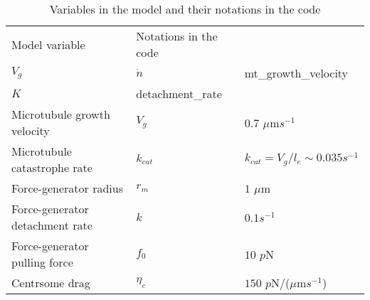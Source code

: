 \documentclass[11pt]{article}
\begin{document}
%
\begin{table}[h]
\caption{Variables in the model and their notations in the code}
\begin{center}
\begin{tabular}{@{}lll@{}}
        \toprule
        Model variable & Notations in the code \\
        \cmidrule(r){1-1}\cmidrule(lr){2-2}\cmidrule(l){3-3}
        $V_g$ &  $\dot n$ & mt_growth_velocity\\
        $K$ & detachment_rate  \\
        Microtubule growth velocity      &   $V_g$   & $0.7$  $\mu\text{m}s^{-1}$ \\
        Microtubule catastrophe rate & $k_{cat}$ & $k_{cat}=V_g/l_e\sim 0.035 s^{-1}$\\
        Force-generator radius &  $r_m$ &  $1$ $\mu\text{m}$\\
        Force-generator detachment rate & $k$  & $0.1 s^{-1}$ \\
        Force-generator pulling force   &  $f_0$  & $10$ $p$N\\
        Centrsome drag       &  $\eta_c$  &  $150$  $p$N/($\mu$m$s^{-1}$)\\
        \bottomrule
\end{tabular}
\end{center}
\end{table}
%
\end{document}

